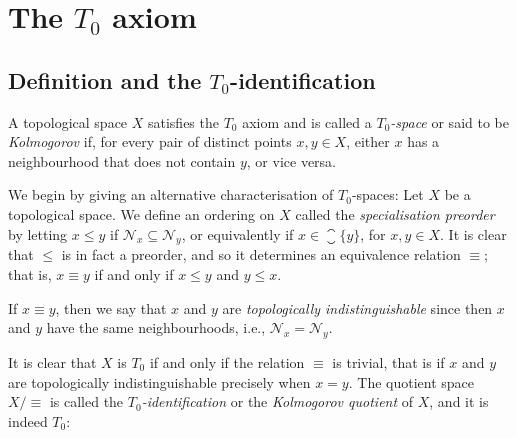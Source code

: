 \documentclass[article, a4paper, 11pt, oneside]{memoir}
\numberwithin{equation}{chapter}
\newcommand{\calN}{\mathcal{N}}
\newcommand{\nhoodfilter}[1]{\calN_{#1}}
\begin{document}
\chapter[The T0 axiom][The $T_0$ axiom]{The $T_0$ axiom}

\section[Definition and the T0-identification][Definition and the $T_0$-identification]{Definition and the $T_0$-identification}

\begin{definition}
    A topological space $X$ satisfies the $T_0$ axiom and is called a \emph{$T_0$-space} or said to be \emph{Kolmogorov} if, for every pair of distinct points $x,y \in X$, either $x$ has a neighbourhood that does not contain $y$, or vice versa.
\end{definition}

We begin by giving an alternative characterisation of $T_0$-spaces: Let $X$ be a topological space. We define an ordering on $X$ called the \emph{specialisation preorder} by letting $x \leq y$ if $\nhoodfilter{x} \subseteq \nhoodfilter{y}$, or equivalently if $x \in \closure{\{y\}}$, for $x,y \in X$. It is clear that $\leq$ is in fact a preorder, and so it determines an equivalence relation $\equiv$; that is, $x \equiv y$ if and only if $x \leq y$ and $y \leq x$.

If $x \equiv y$, then we say that $x$ and $y$ are \emph{topologically indistinguishable} since then $x$ and $y$ have the same neighbourhoods, i.e., $\nhoodfilter{x} = \nhoodfilter{y}$.

It is clear that $X$ is $T_0$ if and only if the relation $\equiv$ is trivial, that is if $x$ and $y$ are topologically indistinguishable precisely when $x = y$. The quotient space $X/{\equiv}$ is called the \emph{$T_0$-identification} or the \emph{Kolmogorov quotient} of $X$, and it is indeed $T_0$:
\end{document}
